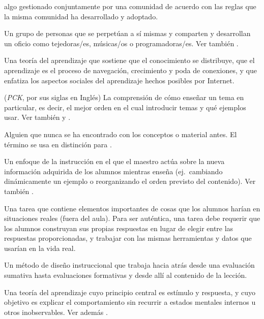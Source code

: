 \begin{description}
 algo gestionado conjuntamente por una comunidad 
de acuerdo con las reglas que la misma comunidad ha desarrollado y adoptado.

 Un grupo de personas que se perpetúan a sí mismas 
y comparten y desarrollan un oficio como tejedoras/es, músicas/os o programadoras/es. Ver también
.

 Una teoría del aprendizaje que sostiene que el conocimiento se distribuye, 
que el aprendizaje es el proceso de navegación, crecimiento y poda de conexiones, y que enfatiza los aspectos 
sociales del aprendizaje hechos posibles por Internet.

 (\emph{PCK}, por sus siglas en Inglés) La comprensión de cómo enseñar un tema en particular, es decir, el mejor orden en el cual introducir temas y qué ejemplos usar. Ver también
y .

 Alguien que nunca se ha
encontrado con los conceptos o material antes. El término se usa en distinción para
.


 Un enfoque de la instrucción en el que el
maestro actúa sobre la nueva información adquirida de los alumnos mientras enseña (ej.\ cambiando
dinámicamente un ejemplo o reorganizando el orden previsto del contenido).
Ver también .

 Una tarea que contiene elementos importantes 
de cosas que los alumnos harían en situaciones reales (fuera del aula). Para 
ser auténtica, una tarea debe requerir que los alumnos construyan sus propias respuestas
en lugar de elegir entre las respuestas proporcionadas, y trabajar con las mismas 
herramientas y datos que usarían en la vida real.


 Un método de diseño instruccional que
trabaja hacia atrás desde una evaluación sumativa hasta evaluaciones formativas y desde allí
al contenido de la lección.

 Una teoría del aprendizaje cuyo principio central
es estímulo y respuesta, y cuyo objetivo es explicar el comportamiento sin recurrir
a estados mentales internos u otros inobservables. Ver
además .


\end{description}
